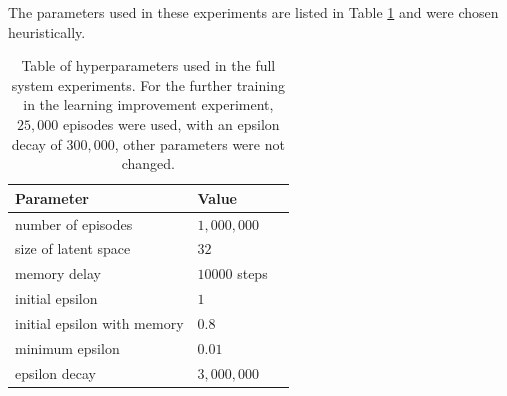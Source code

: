 The parameters used in these experiments are listed in Table \ref{tab:hyperparas} and were chosen heuristically.

\begin{table}[t]
\centering
\begin{tabular}{@{}lll@{}}
\toprule
\textbf{Parameter} & \textbf{Value} \\ \midrule
number of episodes & $1,000,000$  \\
size of latent space & $32$  \\
memory delay & $10000$ steps  \\
initial epsilon & $1$  \\
initial epsilon with memory & $0.8$  \\
minimum epsilon & $0.01$  \\
epsilon decay & $3,000,000$  \\ \bottomrule
\end{tabular}
\caption{Table of hyperparameters used in the full system experiments. For the further training in the learning improvement experiment, $25,000$ episodes were used, with an epsilon decay of $300,000$, other parameters were not changed.  \label{tab:hyperparas}}
\end{table}
